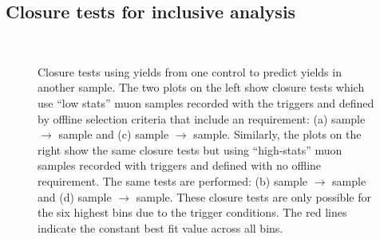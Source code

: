 \newpage
\subsection{Closure tests for inclusive analysis\label{app:closure-incl}}

\begin{figure}[!h]
  \begin{center}
     \\
    \caption{Closure tests using yields from one control to predict
      yields in another sample. The two plots on the left show closure
      tests which use ``low stats'' muon samples recorded with the
      \htalphat triggers and defined by offline selection criteria
      that include an \alt requirement: (a) \mj sample
      $\rightarrow$ \mmj sample and (c) \gj sample $\rightarrow$ \mmj
      sample. Similarly, the plots on the right show the same closure
      tests but using ``high-stats'' muon samples recorded with \muht
      triggers and defined with no offline \alt requirement. The
      same tests are performed: (b) \mj sample $\rightarrow$ \mmj
      sample and (d) \gj sample $\rightarrow$ \mmj sample. These
      closure tests are only possible for the six highest \HT bins
      due to the trigger conditions. The red lines indicate the
      constant best fit value across all \HT bins.}
    \label{fig:closure-with-alphat2}
  \end{center}
\end{figure}

